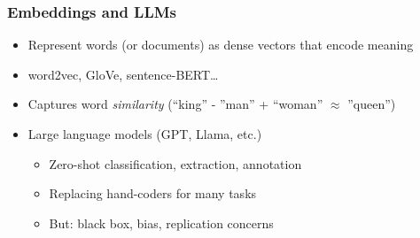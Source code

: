 \begin{frame}
\frametitle{Embeddings and LLMs}
\centering

\begin{itemize}[<+->]
\item Represent words (or documents) as dense vectors that encode meaning
\item word2vec, GloVe, sentence-BERT\ldots
\vspace{6pt}
\item Captures word \textit{similarity} (``king'' - ''man'' + ``woman'' $\approx$ ''queen'')
\vspace{6pt}
\item Large language models (GPT, Llama, etc.)
  \begin{itemize}
  \item Zero-shot classification, extraction, annotation
  \item Replacing hand-coders for many tasks
  \item But: black box, bias, replication concerns
  \end{itemize}
\end{itemize}

\end{frame}

